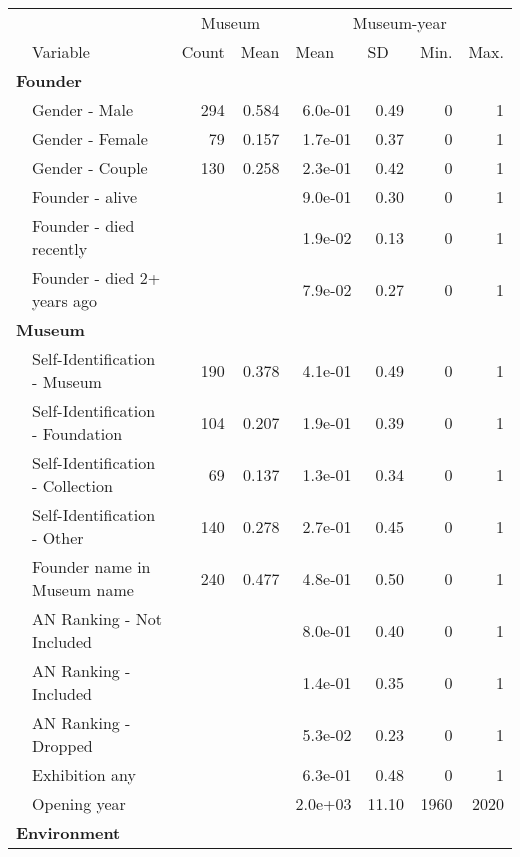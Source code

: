 \documentclass[12pt]{article}
\begin{document}
\begin{table}[ht]
\centering
\begin{tabular}{llrrrrrr}
  \hline
 & & \multicolumn{2}{c}{Museum} & \multicolumn{4}{c}{Museum-year} \\ 
\cmidrule(r){3-4}\cmidrule(r){5-8} \multicolumn{1}{l}{} & \multicolumn{1}{l}{Variable} & \multicolumn{1}{l}{Count} & \multicolumn{1}{l}{Mean} & \multicolumn{1}{l}{Mean} & \multicolumn{1}{l}{SD} & \multicolumn{1}{l}{Min.} & \multicolumn{1}{l}{Max.}\\ 
 \hline
  \multicolumn{8}{l}{\textbf{Founder}} \\ 
 & Gender - Male & 294 & 0.584 & 6.0e-01 &  0.49 & 0 & 1 \\ 
   & Gender - Female & 79 & 0.157 & 1.7e-01 &  0.37 & 0 & 1 \\ 
   & Gender - Couple & 130 & 0.258 & 2.3e-01 &  0.42 & 0 & 1 \\ 
   & Founder - alive &  &  & 9.0e-01 &  0.30 & 0 & 1 \\ 
   & Founder - died recently &  &  & 1.9e-02 &  0.13 & 0 & 1 \\ 
   & Founder - died 2+ years ago &  &  & 7.9e-02 &  0.27 & 0 & 1 \\ 
   \multicolumn{8}{l}{\textbf{Museum}} \\ 
 & Self-Identification - Museum & 190 & 0.378 & 4.1e-01 &  0.49 & 0 & 1 \\ 
   & Self-Identification - Foundation & 104 & 0.207 & 1.9e-01 &  0.39 & 0 & 1 \\ 
   & Self-Identification - Collection & 69 & 0.137 & 1.3e-01 &  0.34 & 0 & 1 \\ 
   & Self-Identification - Other & 140 & 0.278 & 2.7e-01 &  0.45 & 0 & 1 \\ 
   & Founder name in Museum name & 240 & 0.477 & 4.8e-01 &  0.50 & 0 & 1 \\ 
   & AN Ranking - Not Included &  &  & 8.0e-01 &  0.40 & 0 & 1 \\ 
   & AN Ranking - Included &  &  & 1.4e-01 &  0.35 & 0 & 1 \\ 
   & AN Ranking - Dropped &  &  & 5.3e-02 &  0.23 & 0 & 1 \\ 
   & Exhibition any &  &  & 6.3e-01 &  0.48 & 0 & 1 \\ 
   & Opening year &  &  & 2.0e+03 & 11.10 & 1960 & 2020 \\ 
   \multicolumn{8}{l}{\textbf{Environment}} \\ 

\end{tabular}
\end{table}
\end{document}
